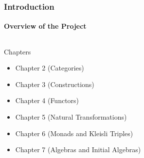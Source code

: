 \documentclass{beamer}
\begin{document}
\begin{frame}[label={overview}]
  \frametitle{Introduction}
  \framesubtitle{Overview of the Project}

  \begin{columns}[onlytextwidth,c]
    \begin{column}{.8\textwidth}
      \begin{block}{Chapters}
        \begin{itemize}
        \item Chapter 2 (Categories)
        \item Chapter 3 (Constructions)
        \item Chapter 4 (Functors)
        \item Chapter 5 (Natural Transformations)
        \item Chapter 6 (Monads and Kleisli Triples)
        \item Chapter 7 (Algebras and Initial Algebras)
        \end{itemize}
      \end{block}
    \end{column}
    \begin{column}{.2\textwidth}
      \begin{center}
      \end{center}
    \end{column}
  \end{columns}

\end{frame}

\end{document}
